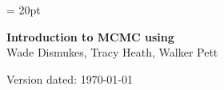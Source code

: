 \documentclass[11pt]{article}
\begin{document}
\renewcommand{\headrulewidth}{0.5pt}
\headsep = 20pt
\lhead{ }

\thispagestyle{plain}
\begin{center}

\textbf{\LARGE Introduction to MCMC using \RevBayes}\\\vspace{2mm}
\vspace{1cm}
{\Large Wade Dismukes, Tracy Heath, Walker Pett}
\vspace{1cm}
\end{center}

\def \ResourcePath {./}
\def \GlobalResourcePath {../}


Version dated: \today
\end{document}
